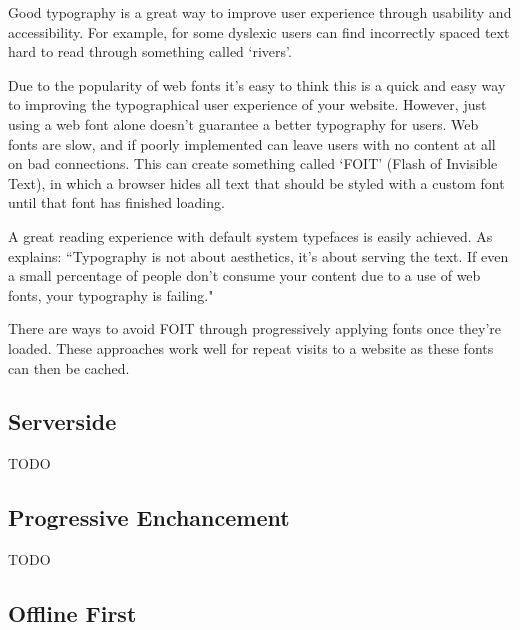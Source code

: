 Good typography is a great way to improve user experience through usability and accessibility. For example, for some dyslexic users can find incorrectly spaced text hard to read through something called `rivers'. \cite{dyslexia}

Due to the popularity of web fonts it's easy to think this is a quick and easy way to improving the typographical user experience of your website. However, just using a web font alone doesn't guarantee a better typography for users. Web fonts are slow, and if poorly implemented can leave users with no content at all on bad connections. This can create something called `FOIT' (Flash of Invisible Text), in which a browser hides all text that should be styled with a custom font until that font has finished loading. \cite{FOIT}

A great reading experience with default system typefaces is easily achieved. As \cite{against_webfonts} explains: ``Typography is not about aesthetics, it's about serving the text. If even a small percentage of people don't consume your content due to a use of web fonts, your typography is failing."

There are ways to avoid FOIT through progressively applying fonts once they're loaded. These approaches work well for repeat visits to a website as these fonts can then be cached. \cite{FOIT}

\subsection{Serverside} \label{l-r--serverside}

TODO


\subsection{Progressive Enchancement} \label{l-r--progressive-enhancement}

TODO


\subsection{Offline First} \label{l-r--offline-first}

